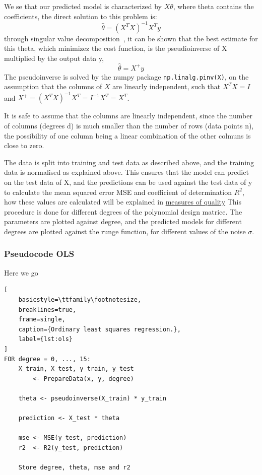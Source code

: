 \documentclass[aps,rmp,reprint,amsmath,amssymb,longbibliography]{revtex4-1}
\begin{document}
We se that our predicted model is characterized by $X\theta$, where theta contains the coefficients, the direct solution to this problem is:
\begin{equation}
  \hat{\theta} = (X^{T}X)^{-1}X^{T}y
\end{equation}
\cite[p.~81]{LectureNotes}
through singular value decomposition~\cite[p.~42]{LectureNotes}, it can be shown that the best estimate for this theta, which
minimizez the cost function, is the pseudioinverse of X multiplied by the output data y,
\begin{equation}
  \hat{\theta} = X^{+}y
\end{equation} \cite[p.~82]{LectureNotes}
The pseudoinverse is solved by the numpy package \texttt{np.linalg.pinv(X)}, on the assumption that
the columns of $X$ are linearly independent, such that $X^{T}X = I$ and $X^{+}=(X^{T}X)^{-1}X^{T}=I^{-1}X^{T}=X^{T}$.

It is safe to assume that the columns are linearly independent, since the number of columns (degrees d) is much smaller than the number of rows (data points n),
the possibility of one column being a linear combination of the other colmuns is close to zero.

The data is split into training and test data as described above, and the training data is normalised
as explained above. This ensures that the model can predict on the test data of X, and the predictions
can be used against the test data of y to calculate the mean squared error MSE and coefficient of determination $R^2$, how these values are calculated will be explained in \hyperref[sec:PF]{measures of quality}
This procedure is done for different degrees of the polynomial design matrice. The parameters are plotted against degree, and the predicted
models for different degrees are plotted against the runge function, for different values of the noise $\sigma$.
\subsubsection{Pseudocode OLS}
Here we go
\begin{lstlisting}[
    basicstyle=\ttfamily\footnotesize,
    breaklines=true,
    frame=single,
    caption={Ordinary least squares regression.},
    label={lst:ols}
]
FOR degree = 0, ..., 15:
    X_train, X_test, y_train, y_test
        <- PrepareData(x, y, degree)

    theta <- pseudoinverse(X_train) * y_train

    prediction <- X_test * theta

    mse <- MSE(y_test, prediction)
    r2  <- R2(y_test, prediction)

    Store degree, theta, mse and r2
\end{lstlisting}
\end{document}
